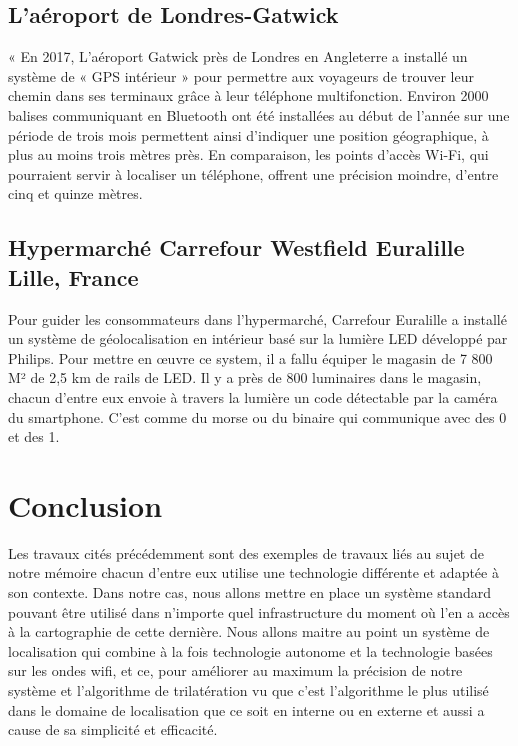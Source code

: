 \documentclass[12pt,a4paper]{report}
\begin{document}
\subsection{L’aéroport de Londres-Gatwick }
« En 2017, L’aéroport Gatwick près de Londres en Angleterre a installé un système de « GPS intérieur » pour permettre aux voyageurs de trouver leur chemin dans ses terminaux grâce à leur téléphone multifonction. Environ 2000 balises communiquant en Bluetooth ont été installées au début de l’année sur une période de trois mois permettent ainsi d’indiquer une position géographique, à plus au moins trois mètres près. En comparaison, les points d’accès Wi-Fi, qui pourraient servir à localiser un téléphone, offrent une précision moindre, d’entre cinq et quinze mètres.\cite{WEBSITE:2}

\subsection{Hypermarché Carrefour  Westfield Euralille Lille, France}
Pour guider les consommateurs dans l'hypermarché, Carrefour Euralille a installé un système de géolocalisation en intérieur basé sur la lumière LED développé par Philips.
Pour mettre en œuvre ce system, il a fallu équiper le magasin de 7 800 M² de 2,5 km de rails de LED. Il y a près de 800 luminaires dans le magasin, chacun d'entre eux envoie à travers la lumière un code détectable par la caméra du smartphone. C'est comme du morse ou du binaire qui communique avec des 0 et des 1.\cite{WEBSITE:3}

\section{Conclusion}

Les travaux cités précédemment sont des exemples de travaux liés au sujet de notre mémoire chacun d’entre eux utilise une technologie différente et adaptée à son contexte. 
Dans notre cas, nous allons mettre en place un système standard pouvant être utilisé dans n’importe quel infrastructure du moment où l’en a accès à la cartographie de cette dernière.
Nous allons maitre au point un système de localisation qui combine à la fois technologie autonome et la technologie basées sur les ondes wifi, et ce, pour améliorer au maximum la précision de notre système et l’algorithme de trilatération vu que c’est l’algorithme le plus utilisé dans le domaine de localisation que ce soit en interne ou en externe et aussi a cause de sa simplicité et efficacité.
\end{document}
